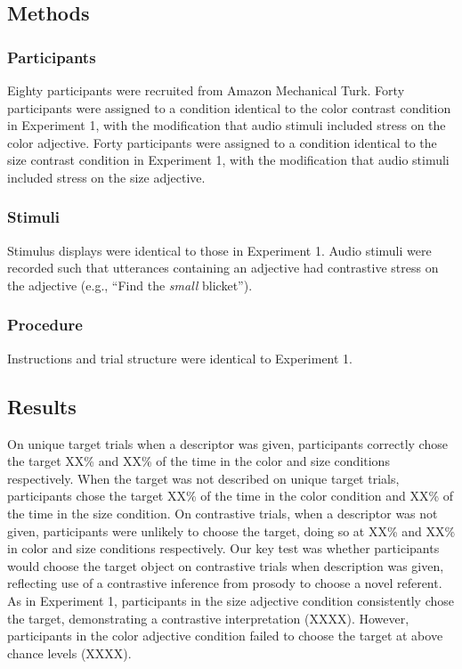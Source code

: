\documentclass[10pt, letterpaper]{article}
\begin{document}
\subsection{Methods}\label{methods-2}

\subsubsection{Participants}\label{participants-2}

Eighty participants were recruited from Amazon Mechanical Turk. Forty
participants were assigned to a condition identical to the color
contrast condition in Experiment 1, with the modification that audio
stimuli included stress on the color adjective. Forty participants were
assigned to a condition identical to the size contrast condition in
Experiment 1, with the modification that audio stimuli included stress
on the size adjective.

\subsubsection{Stimuli}\label{stimuli-2}

Stimulus displays were identical to those in Experiment 1. Audio stimuli
were recorded such that utterances containing an adjective had
contrastive stress on the adjective (e.g., ``Find the \emph{small}
blicket'').

\subsubsection{Procedure}\label{procedure-2}

Instructions and trial structure were identical to Experiment 1.

\subsection{Results}\label{results-2}

On unique target trials when a descriptor was given, participants
correctly chose the target XX\% and XX\% of the time in the color and
size conditions respectively. When the target was not described on
unique target trials, participants chose the target XX\% of the time in
the color condition and XX\% of the time in the size condition. On
contrastive trials, when a descriptor was not given, participants were
unlikely to choose the target, doing so at XX\% and XX\% in color and
size conditions respectively. Our key test was whether participants
would choose the target object on contrastive trials when description
was given, reflecting use of a contrastive inference from prosody to
choose a novel referent. As in Experiment 1, participants in the size
adjective condition consistently chose the target, demonstrating a
contrastive interpretation (XXXX). However, participants in the color
adjective condition failed to choose the target at above chance levels
(XXXX).
\end{document}
